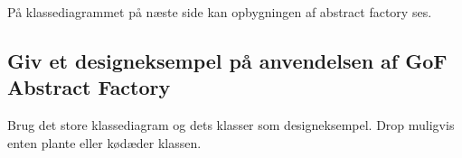 På klassediagrammet på næste side kan opbygningen af abstract  factory ses.

\subsection{Giv et designeksempel på anvendelsen af GoF Abstract Factory}
Brug det store klassediagram og dets klasser som designeksempel. Drop muligvis enten plante eller kødæder klassen.

\label{div:abstractfactoryclassdiagram}

